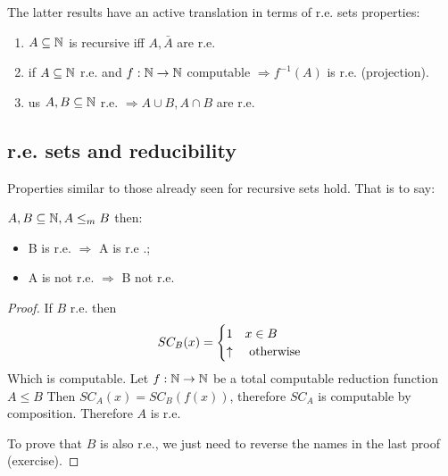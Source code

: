 \begin{observation}
  The latter results have an active translation in terms of r.e. sets
  properties:
  \begin{enumerate}[label=(\arabic*)]
  \item $A \subseteq \mathbb{N}$ is recursive iff $A, \bar{A}$ are r.e.
  \item if $A \subseteq \mathbb{N}$ r.e. and $f : \mathbb{N} \to \mathbb{N}$ computable
    $\Rightarrow f^{-1}(A)$ is r.e. (projection).
  \item us $A,B \subseteq \mathbb{N}$ r.e. $\Rightarrow A \cup B, A \cap B$
    are r.e.
  \end{enumerate}
\end{observation}

\subsection{r.e. sets and reducibility}

Properties similar to those already seen for recursive sets hold. That
is to say:

\begin{observation}
  $ A,B \subseteq \mathbb{N}, A\leq_m B $ then:
  \begin{itemize}
  \item B is r.e. $ \Rightarrow $ A is r.e .;
  \item A is not r.e. $ \Rightarrow $ B not r.e.
  \end{itemize}
  \begin{proof}
    If $B$ r.e. then
    \begin{equation*}
      SC_B(x) = \begin{cases}
        1 & x \in B \\
        \uparrow & $ otherwise $
      \end{cases}
    \end{equation*}
    Which is computable.  Let $ f:\mathbb{N}\rightarrow\mathbb{N} $ be a total
    computable reduction function\\ $ A\leq B $ Then
    $ SC_A(x) = SC_B(f(x)) $, therefore $ SC_A $ is computable by
    composition. Therefore $A$ is r.e.

    To prove that $B$ is also r.e., we just need to reverse the names in
    the last proof (exercise).
  \end{proof}
\end{observation}
